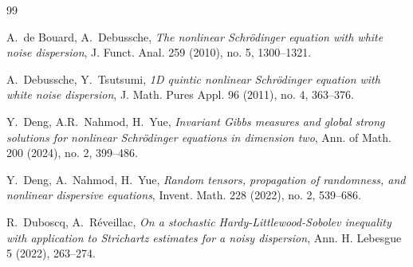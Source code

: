 \documentclass[letterpaper, 11pt,  reqno]{amsart}
\newcommand{\1}{\hspace{0.5mm}\textup{I}\hspace{0.5mm}}
\numberwithin{equation}{section}
\numberwithin{theorem}{section}
\begin{document}
\begin{thebibliography}{99}
%
%
%
%


A.~de Bouard, A.~Debussche, 
{\it The nonlinear Schr\"odinger equation with white noise dispersion},
J. Funct. Anal. 259 (2010), no. 5, 1300--1321. 



%
%
% 
 
 

 

A.~Debussche, Y.~Tsutsumi, 
{\it 1D quintic nonlinear Schr\"odinger equation with white noise dispersion},
 J. Math. Pures Appl.  96 (2011), no. 4, 363--376. 





Y.~Deng, A.R.~Nahmod, H.~Yue,
{\it Invariant Gibbs measures and global strong solutions for nonlinear Schr\"odinger equations in dimension two},
Ann. of Math.  200 (2024), no. 2, 399--486.

 
 
   Y.~Deng, A.~Nahmod,  H.~Yue,
  {\it Random tensors, propagation of randomness, and
  nonlinear dispersive equations}, 
  Invent.
  Math. 228 (2022), no. 2, 539--686.

 
% 
 

R.~Duboscq, A.~R\'eveillac, 
{\it On a stochastic Hardy-Littlewood-Sobolev inequality with application to Strichartz estimates for a noisy dispersion}, 
Ann. H. Lebesgue 5 (2022), 263--274. 






\end{thebibliography}
\end{document}
